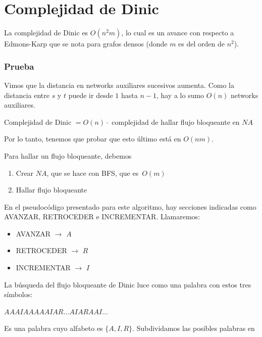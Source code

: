 \documentclass[10pt,a4paper]{article}
\begin{document}
\section*{Complejidad de Dinic}

La complejidad de Dinic es $O(n^2m)$, lo cual es un avance con respecto a Edmons-Karp que se nota para grafos densos (donde $m$ es del orden de $n^2$).

\subsubsection*{Prueba}

Vimos que la distancia en networks auxiliares sucesivos aumenta. Como la distancia entre $s$ y $t$ puede ir desde $1$ hasta $n -1$, hay a lo sumo $O(n)$ networks auxiliares.

\begin{center}
Complejidad de Dinic $= O(n)\cdot $ complejidad de hallar flujo bloqueante en $NA$
\end{center}

Por lo tanto, tenemos que probar que esto último está en $O(nm)$.

Para hallar un flujo bloqueante, debemos

\begin{enumerate}

	\item Crear $NA$, que se hace con BFS, que es $O(m)$
	\item Hallar flujo bloqueante
\end{enumerate}

En el pseudocódigo presentado para este algoritmo, hay secciones indicadas como AVANZAR, RETROCEDER e INCREMENTAR. Llamaremos:

\begin{itemize}

	\item AVANZAR $\rightarrow$ $A$
	\item RETROCEDER $\rightarrow$ $R$
	\item INCREMENTAR $\rightarrow$ $I$
\end{itemize}

La búsqueda del flujo bloqueante de Dinic luce como una palabra con estos tres símbolos:

\begin{center}
$AAAIAAAAAIAR\dots AIARAAI\dots$
\end{center}

Es una palabra cuyo alfabeto es $\{A, I, R\}$. Subdividamos las posibles palabras en
\end{document}
